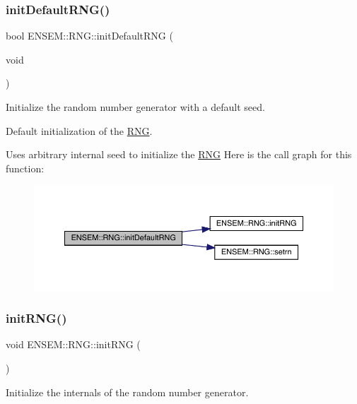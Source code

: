 \subsubsection{\texorpdfstring{initDefaultRNG()}{initDefaultRNG()}}
{\footnotesize\ttfamily bool E\+N\+S\+E\+M\+::\+R\+N\+G\+::init\+Default\+R\+NG (\begin{DoxyParamCaption}\item[{void}]{ }\end{DoxyParamCaption})}



Initialize the random number generator with a default seed. 

Default initialization of the \mbox{\hyperlink{namespaceENSEM_1_1RNG}{R\+NG}}.

Uses arbitrary internal seed to initialize the \mbox{\hyperlink{namespaceENSEM_1_1RNG}{R\+NG}} Here is the call graph for this function\+:\nopagebreak
\begin{figure}[H]
\begin{center}
\leavevmode
\includegraphics[width=350pt]{d8/d9c/namespaceENSEM_1_1RNG_a4a7ec2d430ab092440b9c3b2b5fd9e64_cgraph}
\end{center}
\end{figure}
\mbox{\label{namespaceENSEM_1_1RNG_a69ee665fc3157b2080c75a027343d449}} 
\subsubsection{\texorpdfstring{initRNG()}{initRNG()}}
{\footnotesize\ttfamily void E\+N\+S\+E\+M\+::\+R\+N\+G\+::init\+R\+NG (\begin{DoxyParamCaption}{ }\end{DoxyParamCaption})}



Initialize the internals of the random number generator. 

